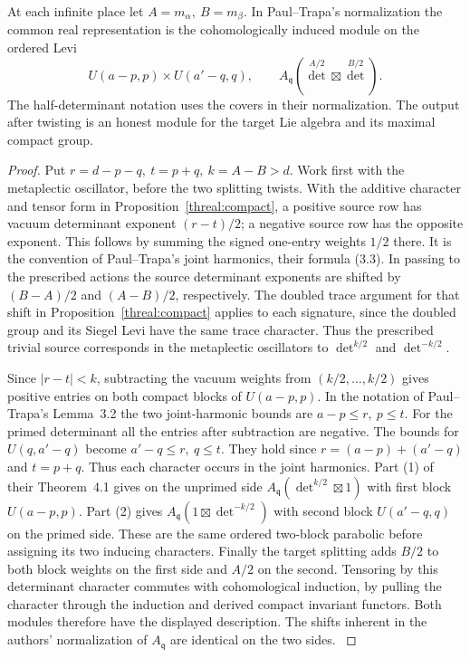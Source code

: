 \begin{proposition}\label{threal:allreal}
At each infinite place let \(A=m_\alpha,\ B=m_\beta\).
In Paul--Trapa's normalization the common real representation
is the cohomologically induced module on the ordered Levi
\[
 U(a-p,p)\times U(a'-q,q),\qquad
 A_{\mathfrak q}(\det^{A/2}\boxtimes\det^{B/2}).
\]
The half-determinant notation uses the covers in their normalization.
The output after twisting is an honest module for the target Lie
algebra and its maximal compact group.
\end{proposition}
\begin{proof}
Put \(r=d-p-q,\ t=p+q,\ k=A-B>d\). Work first with the
metaplectic oscillator, before the two splitting twists. With the
additive character and tensor form in Proposition~\ref{threal:compact},
a positive source row has vacuum determinant exponent \((r-t)/2\);
a negative source row has the opposite exponent. This follows by
summing the signed one-entry weights \(1/2\) there. It is the
convention of Paul--Trapa's joint harmonics, their formula (3.3).
In passing to the prescribed actions the source determinant exponents
are shifted by \((B-A)/2\) and \((A-B)/2\), respectively.
The doubled trace argument for that shift in
Proposition~\ref{threal:compact} applies to each signature, since
the doubled group and its Siegel Levi have the same trace character.
Thus the prescribed trivial source corresponds in the metaplectic
oscillators to \(\det^{k/2}\) and \(\det^{-k/2}\).

Since \(|r-t|<k\), subtracting the vacuum weights from
\((k/2,\ldots,k/2)\) gives positive entries on both compact
blocks of \(U(a-p,p)\). In the notation of Paul--Trapa's Lemma~3.2
the two joint-harmonic bounds are \(a-p\le r,\ p\le t\).
For the primed determinant all the entries after subtraction
are negative. The bounds for \(U(q,a'-q)\) become
\(a'-q\le r,\ q\le t\). They hold since \(r=(a-p)+(a'-q)\)
and \(t=p+q\). Thus each character occurs in the joint harmonics.
Part (1) of their Theorem~4.1 gives on the unprimed side
\(A_{\mathfrak q}(\det^{k/2}\boxtimes 1)\) with first block
\(U(a-p,p)\). Part (2) gives
\(A_{\mathfrak q}(1\boxtimes\det^{-k/2})\) with second block
\(U(a'-q,q)\) on the primed side. These are the same ordered
two-block parabolic before assigning its two inducing characters.
Finally the target splitting adds \(B/2\) to both block weights
on the first side and \(A/2\) on the second. Tensoring by this
determinant character commutes with cohomological induction, by
pulling the character through the induction and derived compact
invariant functors. Both modules therefore have the displayed
description. The shifts inherent in the authors' normalization
of \(A_{\mathfrak q}\) are identical on the two sides.
\cite[\S\S2.1, 2.3, 2.8, Lemma~3.2, Theorem~4.1 and Corollary~4.3]{paulTrapaHowe}


\end{proof}
